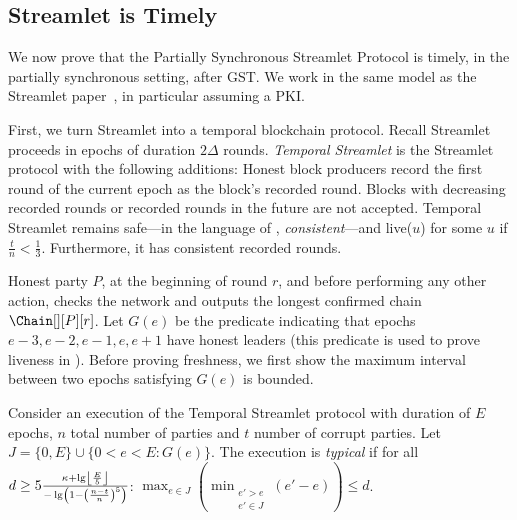 \subsection{Streamlet is Timely}

We now prove that the Partially Synchronous Streamlet Protocol is timely,
in the partially synchronous setting, after GST.
We work in the same model as the Streamlet paper~\cite{streamlet},
in particular assuming a PKI.

First, we turn Streamlet into a temporal blockchain protocol.
Recall Streamlet proceeds in epochs of duration $2\Delta$ rounds.
\emph{Temporal Streamlet} is the Streamlet protocol with the
following additions: Honest block producers record the first round of the current epoch as the block's recorded round.
Blocks with decreasing recorded rounds or recorded rounds in the future are not accepted.
Temporal Streamlet remains safe---in the language of \cite{streamlet}, \emph{consistent}---and live($u$) for some $u$
if $\frac{t}{n} < \frac{1}{3}$. Furthermore, it has consistent recorded rounds.

Honest party $P$, at the beginning of round $r$, and
before performing any other action, checks the network and
outputs the longest confirmed chain $\Chain[][P][r]$.
Let $G(e)$ be the predicate indicating that epochs $e-3,e-2,e-1,e,e+1$ have honest leaders (this predicate is used to prove liveness in \cite{streamlet}).
Before proving freshness, we first show the maximum interval between two epochs satisfying $G(e)$ is bounded.

\begin{definition}
  Consider an execution of the Temporal Streamlet protocol with duration
  of $E$ epochs, $n$ total number of parties and $t$ number of corrupt parties.
  Let $J = \{0,E\} \cup \{0 < e < E: G(e)\}$.
  The execution is \emph{typical} if for all
  $d \geq 5\frac{\kappa + \lg \floor*{\frac{E}{5}}}{- \lg \left(1 - \left(\frac{n - t}{n}\right)^5\right)}$:
  $\max_{e \in J}(\min_{\substack{e' > e \\ e' \in J}}(e' - e)) \leq d$.
\end{definition}

